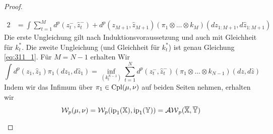\begin{proof}
\begin{enumerate}[(i)]
\begin{alignat*}{2}
&= \int \sum_{t=1}^{M}d^p(z_t^-, \hat{z}_t^-) + d^p(z_{M+1}, \hat{z}_{M+1})(\pi_1 \otimes ...\otimes k_M)(dz_{1:M+1}, d\hat{z}_{1:M+1})
\end{alignat*}
Die erste Ungleichung gilt nach Induktionsvoraussetzung und auch mit Gleichheit für $k_t^*$. Die zweite Ungleichung (und Gleichheit für $k_t^*$) ist genau Gleichung \ref{eq:311_1}.
Für $M=N-1$ erhalten Wir
$$\int d^p(z_1, \hat{z}_1)\pi_1(dz_1, d\hat{z}_1) = \inf_{(k_t^{N-1})} \sum_{t=1}^Nd^p(z_t^-, \hat{z}_t^-)(\pi_1 \otimes ... \otimes k_{N-1})(dz, d\hat{z})$$
Indem wir das Infimum über $\pi_1 \in \operatorname{Cpl}(\mu, \nu)$ auf beiden Seiten nehmen, erhalten wir
$$\mathcal{W}_p(\mu, \nu) = \mathcal{W}_p(\operatorname{ip}_1(\mathbb{X}), \operatorname{ip}_1(\mathbb{Y})) = \mathcal{AW}_p(\overline{\mathbb{X}}, \overline{\mathbb{Y}})$$
\end{enumerate}
\end{proof}

